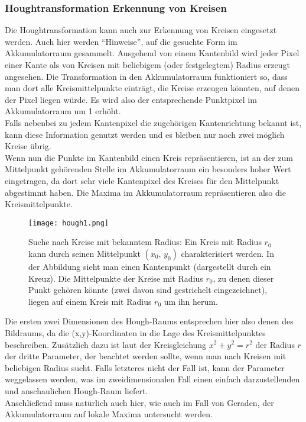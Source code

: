 			
		\subsubsection{Houghtransformation Erkennung von Kreisen}
Die Houghtransformation kann auch zur Erkennung von Kreisen eingesetzt werden. Auch hier werden "`Hinweise"', auf die gesuchte Form im Akkumulatorraum gesammelt. 
Ausgehend von einem Kantenbild wird jeder Pixel einer Kante als von Kreisen mit beliebigem (oder festgelegtem) Radius erzeugt angesehen. Die Transformation in den Akkumulatorraum funktioniert so, dass man dort alle Kreismittelpunkte einträgt, die Kreise erzeugen könnten, auf denen der Pixel liegen würde. Es wird also der entsprechende Punktpixel im Akkumulatorraum um 1 erhöht. \\
Falls nebenbei zu jedem Kantenpixel die zugehörigen Kantenrichtung bekannt  ist, kann diese Information genutzt werden und es bleiben nur noch zwei möglich Kreise übrig.\\
Wenn nun die Punkte im Kantenbild einen Kreis repräsentieren, ist an der zum Mittelpunkt gehörenden Stelle im Akkumulatorraum ein besonders hoher Wert eingetragen, da dort sehr viele Kantenpixel des Kreises für den Mittelpunkt abgestimmt haben. Die Maxima im Akkumulatorraum repräsentieren also die Kreismittelpunkte.

\begin{figure}[H]
  \begin{center}
    \texttt{[image: hough1.png]}
    \caption{Suche nach Kreise mit bekanntem Radius: \newline
Ein Kreis mit Radius $r_0$ kann durch seinen Mittelpunkt $(x_0,\,y_0)$ charakterisiert werden.
In der Abbildung sieht man einen Kantenpunkt (dargestellt durch ein Kreuz). Die Mittelpunkte der Kreise mit Radius $r_0$, zu denen dieser Punkt gehören könnte (zwei davon sind gestrichelt eingezeichnet), liegen auf einem Kreis mit Radius $r_0$ um ihn herum.}
    \label{fig:akku_projection1}
  \end{center}
\end{figure}

Die ersten zwei Dimensionen des Hough-Raums entsprechen hier also denen des Bildraums, da die (x,y)-Koordinaten in die Lage des Kreismittelpunktes beschreiben. Zusätzlich dazu ist laut der Kreisgleichung $x^2 + y^2 = r^2$ der Radius $r$ der dritte Parameter, der beachtet werden sollte, wenn man nach Kreisen mit beliebigen Radius sucht. Falls letzteres nicht der Fall ist, kann der Parameter weggelassen werden, was im zweidimensionalen Fall einen einfach darzustellenden und anschaulichen Hough-Raum liefert. \\
Anschließend muss natürlich auch hier, wie auch im Fall von Geraden, der Akkumulatorraum auf lokale Maxima untersucht werden.